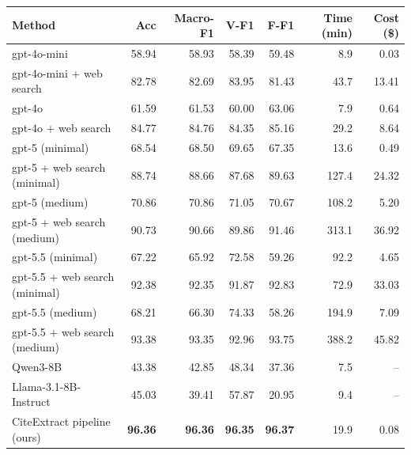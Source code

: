 \begin{tabular}{lrrrrrr}
\toprule
Method & Acc & Macro-F1 & V-F1 & F-F1 & Time (min) & Cost (\$) \\
\midrule
gpt-4o-mini & 58.94 & 58.93 & 58.39 & 59.48 & 8.9 & 0.03 \\
gpt-4o-mini + web search & 82.78 & 82.69 & 83.95 & 81.43 & 43.7 & 13.41 \\
gpt-4o & 61.59 & 61.53 & 60.00 & 63.06 & 7.9 & 0.64 \\
gpt-4o + web search & 84.77 & 84.76 & 84.35 & 85.16 & 29.2 & 8.64 \\
gpt-5 (minimal) & 68.54 & 68.50 & 69.65 & 67.35 & 13.6 & 0.49 \\
gpt-5 + web search (minimal) & 88.74 & 88.66 & 87.68 & 89.63 & 127.4 & 24.32 \\
gpt-5 (medium) & 70.86 & 70.86 & 71.05 & 70.67 & 108.2 & 5.20 \\
gpt-5 + web search (medium) & 90.73 & 90.66 & 89.86 & 91.46 & 313.1 & 36.92 \\
gpt-5.5 (minimal) & 67.22 & 65.92 & 72.58 & 59.26 & 92.2 & 4.65 \\
gpt-5.5 + web search (minimal) & 92.38 & 92.35 & 91.87 & 92.83 & 72.9 & 33.03 \\
gpt-5.5 (medium) & 68.21 & 66.30 & 74.33 & 58.26 & 194.9 & 7.09 \\
gpt-5.5 + web search (medium) & 93.38 & 93.35 & 92.96 & 93.75 & 388.2 & 45.82 \\
Qwen3-8B & 43.38 & 42.85 & 48.34 & 37.36 & 7.5 & -- \\
Llama-3.1-8B-Instruct & 45.03 & 39.41 & 57.87 & 20.95 & 9.4 & -- \\
CiteExtract pipeline (ours) & \textbf{96.36} & \textbf{96.36} & \textbf{96.35} & \textbf{96.37} & 19.9 & 0.08 \\
\bottomrule
\end{tabular}
